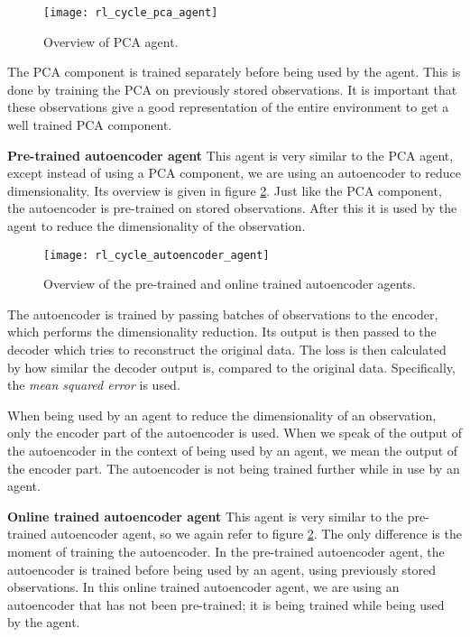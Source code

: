\begin{figure}[h]
    \centering
    \texttt{[image: rl\_cycle\_pca\_agent]}
    \caption{Overview of PCA agent.}
    \label{fig:rl_cycle_pca}
\end{figure}

The PCA component is trained separately before being used by the agent. This is done by training the PCA on previously stored observations. It is important that these observations give a good representation of the entire environment to get a well trained PCA component. \newline

\noindent \textbf{Pre-trained autoencoder agent}\newline
\noindent This agent is very similar to the PCA agent, except instead of using a PCA component, we are using an autoencoder to reduce dimensionality. Its overview is given in figure \ref{fig:rl_cycle_ae}. Just like the PCA component, the autoencoder is pre-trained on stored observations. After this it is used by the agent to reduce the dimensionality of the observation. 

\begin{figure}[h]
    \centering
    \texttt{[image: rl\_cycle\_autoencoder\_agent]}
    \caption{Overview of the pre-trained and online trained autoencoder agents.}
    \label{fig:rl_cycle_ae}
\end{figure}

The autoencoder is trained by passing batches of observations to the encoder, which performs the dimensionality reduction. Its output is then passed to the decoder which tries to reconstruct the original data. The loss is then calculated by how similar the decoder output is, compared to the original data. Specifically, the \emph{mean squared error} is used.

When being used by an agent to reduce the dimensionality of an observation, only the encoder part of the autoencoder is used. When we speak of the output of the autoencoder in the context of being used by an agent, we mean the output of the encoder part. The autoencoder is not being trained further while in use by an agent. \newline

\noindent \textbf{Online trained autoencoder agent}\newline
\noindent  This agent is very similar to the pre-trained autoencoder agent, so we again refer to figure \ref{fig:rl_cycle_ae}. The only difference is the moment of training the autoencoder. In the pre-trained autoencoder agent, the autoencoder is trained before being used by an agent, using previously stored observations. In this online trained autoencoder agent, we are using an autoencoder that has not been pre-trained; it is being trained while being used by the agent. 

